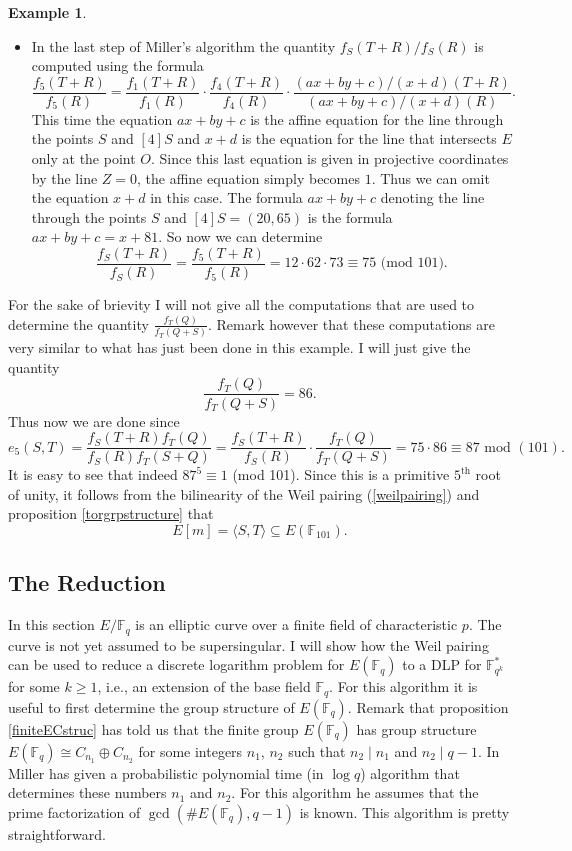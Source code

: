 \documentclass{article}
\numberwithin{equation}{section}
\theoremstyle{definition}
\newtheorem{example}[theorem]{Example}
\newcommand{\FF}[1]{{\mathbb F}_{#1}} %
\newcommand{\grgen}[1]{\langle #1 \rangle} %
\begin{document}
\begin{example}
\begin{itemize}
\item In the last step of Miller's algorithm the quantity $f_S(T+R)/f_S(R)$ is computed using the formula $$\frac{f_5(T+R)}{f_5(R)}=\frac{f_1(T+R)}{f_1(R)}\cdot \frac{f_4(T+R)}{f_4(R)} \cdot \frac{(ax+by+c)/(x+d)(T+R)}{(ax+by+c)/(x+d)(R)}.$$ This time the equation $ax+by+c$ is the affine equation for the line through the points $S$ and $[4]S$ and $x+d$ is the equation for the line that intersects $E$ only at the point $O$. Since this last equation is given in projective coordinates by the line $Z=0$, the affine equation simply becomes $1$. Thus we can omit the equation $x+d$ in this case. The formula $ax+by+c$ denoting the line through the points $S$ and $[4]S=(20,65)$ is the formula $ax+by+c=x+81$. So now we can determine $$\frac{f_S(T+R)}{f_S(R)}=\frac{f_5(T+R)}{f_5(R)}=12\cdot62 \cdot 73 \equiv 75 \text{ (mod }101).$$
\end{itemize}
For the sake of brievity I will not give all the computations that are used to determine the quantity $\frac{f_T(Q)}{f_T(Q+S)}$. Remark however that these computations are very similar to what has just been done in this example. I will just give the quantity $$\frac{f_T(Q)}{f_T(Q+S)}=86.$$ Thus now we are done since $$e_5(S,T)=\frac{f_S(T+R)f_T(Q)}{f_S(R)f_T(S+Q)}=\frac{f_S(T+R)}{f_S(R)}\cdot\frac{f_T(Q)}{f_T(Q+S)}=75 \cdot 86 \equiv 87 \text{ mod }(101).$$ It is easy to see that indeed $87^5 \equiv 1$ (mod 101). Since this is a primitive $5^\text{th}$ root of unity, it follows from the bilinearity of the Weil pairing (\ref{weilpairing}) and proposition \ref{torgrpstructure} that $$E[m]=\grgen{S,T} \subseteq E(\FF{101}).$$
\end{example}



\subsection{The Reduction}\label{reduction}
In this section $E/\FF{q}$ is an elliptic curve over a finite field of characteristic $p$. The curve is not yet assumed to be supersingular. I will show how the Weil pairing can be used to reduce a discrete logarithm problem for $E(\FF{q})$ to a DLP for $\FF{q^k}^*$ for some $k \geq 1$, i.e., an extension of the base field $\FF{q}$. For this algorithm it is useful to first determine the group structure of $E(\FF{q})$. Remark that proposition \ref{finiteECstruc} has told us that the finite group $E(\FF{q})$ has group structure $E(\FF{q}) \cong C_{n_1}\oplus C_{n_2}$ for some integers $n_1$, $n_2$ such that $n_2 \mid n_1$ and $n_2 \mid q-1$.
In \cite{Milleralg} Miller has given a probabilistic polynomial time (in $\log q$) algorithm that determines these numbers $n_1$ and $n_2$. For this algorithm he assumes that the prime factorization of $\gcd (\#E(\FF{q}),q-1)$ is known. This algorithm is pretty straightforward.  
\end{document}
